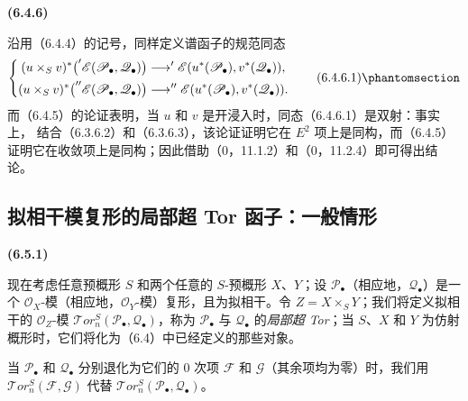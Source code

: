 \documentclass[UTF8,fontset=none,11pt,oneside,openany]{ctexbook}
\newenvironment{env}[1][]{%
  \par\medskip\noindent\textbf{(#1)}\ %
}{\par}
\let\EGAOriginalLabel\label
\renewcommand{\label}[1]{\phantomsection\EGAOriginalLabel{#1}}
\begin{document}
\begin{env}[6.4.6]
沿用（6.4.4）的记号，同样定义谱函子的规范同态
\[
  \left\{
  \begin{aligned}
  (u\times_S v)^*\bigl('\mathscr E(\mathscr P_\bullet,\mathscr Q_\bullet)\bigr)
    &\longrightarrow
      '\mathscr E(u^*(\mathscr P_\bullet),v^*(\mathscr Q_\bullet)),\\
  (u\times_S v)^*\bigl(''\mathscr E(\mathscr P_\bullet,\mathscr Q_\bullet)\bigr)
    &\longrightarrow
      ''\mathscr E(u^*(\mathscr P_\bullet),v^*(\mathscr Q_\bullet)).
  \end{aligned}
  \right.
  \tag{6.4.6.1}\label{III.6.4.6.1-fr}
\]
而（6.4.5）的论证表明，当 $u$ 和 $v$ 是开浸入时，同态（6.4.6.1）是双射：事实上，
结合（6.3.6.2）和（6.3.6.3），该论证证明它在 $E^2$ 项上是同构，而（6.4.5）
证明它在收敛项上是同构；因此借助（0，11.1.2）和（0，11.2.4）即可得出结论。
\end{env}

\subsection{拟相干模复形的局部超 Tor 函子：一般情形}

\begin{env}[6.5.1]
现在考虑任意预概形 $S$ 和两个任意的 $S$-预概形 $X$、$Y$；设
$\mathscr P_\bullet$（相应地，$\mathscr Q_\bullet$）是一个
$\mathscr O_X$-模（相应地，$\mathscr O_Y$-模）复形，且为拟相干。令
$Z=X\times_S Y$；我们将定义拟相干的 $\mathscr O_Z$-模
$\mathscr{T}\!or_n^S(\mathscr P_\bullet,\mathscr Q_\bullet)$，称为
$\mathscr P_\bullet$ 与 $\mathscr Q_\bullet$ 的\emph{局部超 Tor}；当 $S$、$X$ 和
$Y$ 为仿射概形时，它们将化为（6.4）中已经定义的那些对象。

当 $\mathscr P_\bullet$ 和 $\mathscr Q_\bullet$ 分别退化为它们的 0 次项
$\mathscr F$ 和 $\mathscr G$（其余项均为零）时，我们用
$\mathscr{T}\!or_n^S(\mathscr F,\mathscr G)$ 代替
$\mathscr{T}\!or_n^S(\mathscr P_\bullet,\mathscr Q_\bullet)$。
\end{env}
\end{document}
